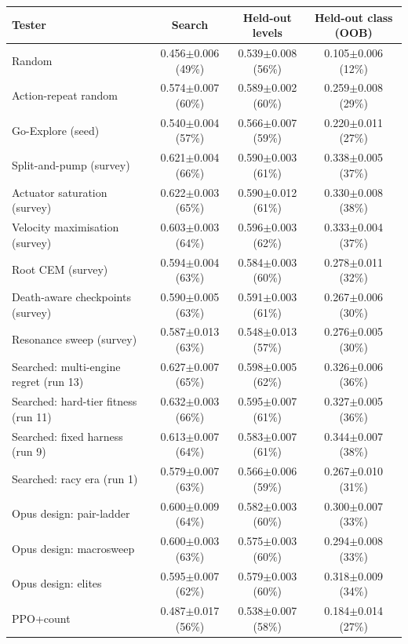 \begin{table}[t]\centering\small
\begin{tabular}{lccc}
\toprule
Tester & Search & Held-out levels & Held-out class (OOB) \\
\midrule
Random & 0.456$\pm$0.006 (49\%) & 0.539$\pm$0.008 (56\%) & 0.105$\pm$0.006 (12\%) \\
Action-repeat random & 0.574$\pm$0.007 (60\%) & 0.589$\pm$0.002 (60\%) & 0.259$\pm$0.008 (29\%) \\
Go-Explore (seed) & 0.540$\pm$0.004 (57\%) & 0.566$\pm$0.007 (59\%) & 0.220$\pm$0.011 (27\%) \\
\midrule
Split-and-pump (survey) & 0.621$\pm$0.004 (66\%) & 0.590$\pm$0.003 (61\%) & 0.338$\pm$0.005 (37\%) \\
Actuator saturation (survey) & 0.622$\pm$0.003 (65\%) & 0.590$\pm$0.012 (61\%) & 0.330$\pm$0.008 (38\%) \\
Velocity maximisation (survey) & 0.603$\pm$0.003 (64\%) & 0.596$\pm$0.003 (62\%) & 0.333$\pm$0.004 (37\%) \\
Root CEM (survey) & 0.594$\pm$0.004 (63\%) & 0.584$\pm$0.003 (60\%) & 0.278$\pm$0.011 (32\%) \\
Death-aware checkpoints (survey) & 0.590$\pm$0.005 (63\%) & 0.591$\pm$0.003 (61\%) & 0.267$\pm$0.006 (30\%) \\
Resonance sweep (survey) & 0.587$\pm$0.013 (63\%) & 0.548$\pm$0.013 (57\%) & 0.276$\pm$0.005 (30\%) \\
\midrule
Searched: multi-engine regret (run 13) & 0.627$\pm$0.007 (65\%) & 0.598$\pm$0.005 (62\%) & 0.326$\pm$0.006 (36\%) \\
Searched: hard-tier fitness (run 11) & 0.632$\pm$0.003 (66\%) & 0.595$\pm$0.007 (61\%) & 0.327$\pm$0.005 (36\%) \\
Searched: fixed harness (run 9) & 0.613$\pm$0.007 (64\%) & 0.583$\pm$0.007 (61\%) & 0.344$\pm$0.007 (38\%) \\
Searched: racy era (run 1) & 0.579$\pm$0.007 (63\%) & 0.566$\pm$0.006 (59\%) & 0.267$\pm$0.010 (31\%) \\
\midrule
Opus design: pair-ladder & 0.600$\pm$0.009 (64\%) & 0.582$\pm$0.003 (60\%) & 0.300$\pm$0.007 (33\%) \\
Opus design: macrosweep & 0.600$\pm$0.003 (63\%) & 0.575$\pm$0.003 (60\%) & 0.294$\pm$0.008 (33\%) \\
Opus design: elites & 0.595$\pm$0.007 (62\%) & 0.579$\pm$0.003 (60\%) & 0.318$\pm$0.009 (34\%) \\
\midrule
PPO+count & 0.487$\pm$0.017 (56\%) & 0.538$\pm$0.007 (58\%) & 0.184$\pm$0.014 (27\%) \\

\end{tabular}
\end{table}
